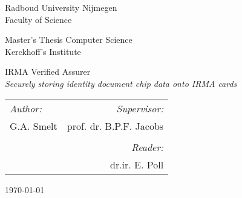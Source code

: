   \thispagestyle{empty}
  \begin{center}
    \vspace*{2cm}
    \huge{{\RUfontbold Radboud University Nijmegen}}\\
    \vspace{0.2cm}
    \LARGE{\RUfont Faculty of Science}
    
    \vspace*{0.5cm}
    \large{\textsf{Master's Thesis Computer Science}}\\
    \LARGE{\textsf{Kerckhoff's Institute}}

    \vspace*{2cm}
    \Huge{\textsf{{IRMA Verified Assurer}}}\\
    \Large{\textsl{Securely storing identity document chip data onto IRMA cards}}

    \vspace*{4cm}
    \begin{tabularx}{0.75\textwidth}{Xr}
      \textsl{Author:} & \textsl{Supervisor:} \\
      G.A. Smelt & prof. dr. B.P.F. Jacobs\\\\
      & \textsl{Reader:}\\
      & dr.ir. E. Poll 
    \end{tabularx}

    \vspace*{2cm}
    \large{\today}
  \end{center}
\restoregeometry